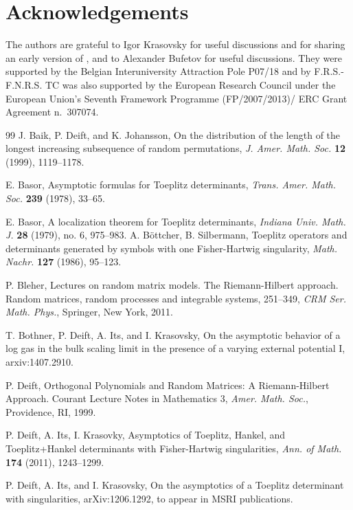 \documentclass[11pt,fleqn]{article}
\numberwithin{equation}{section}
\begin{document}
\section*{Acknowledgements}
The authors are grateful to Igor Krasovsky for useful discussions and for sharing an early version of \cite{BDIK}, and to Alexander Bufetov for useful discussions. They were supported by the Belgian Interuniversity Attraction Pole P07/18 and by F.R.S.-F.N.R.S. TC was also supported by the European Research Council under the European Union's Seventh Framework Programme (FP/2007/2013)/ ERC Grant Agreement n.\, 307074.

\begin{thebibliography}{99}
    J. Baik, P. Deift, and K. Johansson,
    On the distribution of the length of the longest increasing subsequence
    of random permutations,
    {\em J. Amer. Math. Soc.} {\bf 12} (1999), 1119--1178.

 E. Basor, Asymptotic formulas for Toeplitz determinants, {\em Trans.
Amer. Math. Soc.} {\bf 239}  (1978), 33--65.

 E. Basor, A localization theorem for Toeplitz determinants, {\em Indiana Univ. Math. J.} {\bf 28} (1979), no. 6,
975--983.
A. B\"ottcher, B. Silbermann, Toeplitz operators and determinants
generated by symbols with one Fisher-Hartwig singularity, {\em Math.
Nachr.}  {\bf 127}  (1986), 95--123.

 P. Bleher,
Lectures on random matrix models. The Riemann-Hilbert approach. Random matrices, random processes and integrable systems, 251--349, 
{\em CRM Ser. Math. Phys.}, Springer, New York, 2011.

 T. Bothner, P. Deift, A. Its, and I. Krasovsky, On the asymptotic behavior of a log gas in the bulk scaling limit in the presence of a varying external potential I, arxiv:1407.2910.

 P. Deift,
Orthogonal Polynomials and Random Matrices: A Riemann-Hilbert Approach.
Courant Lecture Notes in Mathematics 3,
\textit{Amer. Math. Soc.}, Providence, RI, 1999.

 P. Deift, A. Its, I. Krasovky,
Asymptotics of Toeplitz, Hankel, and Toeplitz+Hankel determinants with Fisher-Hartwig singularities, \textit{Ann. of Math.} \textbf{174} (2011), 1243--1299.

 P. Deift, A. Its, and I. Krasovsky, 
On the asymptotics of a Toeplitz determinant with singularities, arXiv:1206.1292, to appear in MSRI publications.


\end{thebibliography}
\end{document}
